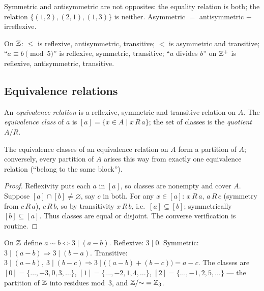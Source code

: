 \begin{notebox}
Symmetric and antisymmetric are not opposites: the equality relation is both;
the relation $\{(1,2),(2,1),(1,3)\}$ is neither. Asymmetric $=$ antisymmetric
$+$ irreflexive.
\end{notebox}

\begin{example}
On $\mathbb{Z}$: $\leq$ is reflexive, antisymmetric, transitive; $<$ is asymmetric and
transitive; ``$a \equiv b \pmod 5$'' is reflexive, symmetric, transitive;
``$a$ divides $b$'' on $\mathbb{Z}^+$ is reflexive, antisymmetric, transitive.
\end{example}

\subsection{Equivalence relations}

\begin{definition}
An \emph{equivalence relation} is a reflexive, symmetric and transitive
relation on $A$. The \emph{equivalence class} of $a$ is
$[a] = \{x \in A \mid x\,R\,a\}$; the set of classes is the \emph{quotient}
$A/R$.
\end{definition}

\begin{theorem}\label{thm:partition}
The equivalence classes of an equivalence relation on $A$ form a partition of
$A$; conversely, every partition of $A$ arises this way from exactly one
equivalence relation (``belong to the same block'').
\end{theorem}

\begin{proof}
Reflexivity puts each $a$ in $[a]$, so classes are nonempty and cover $A$.
Suppose $[a] \cap [b] \neq \varnothing$, say $c$ in both. For any
$x \in [a]$: $x\,R\,a$, $a\,R\,c$ (symmetry from $c\,R\,a$), $c\,R\,b$, so
by transitivity $x\,R\,b$, i.e.\ $[a] \subseteq [b]$; symmetrically
$[b] \subseteq [a]$. Thus classes are equal or disjoint. The converse
verification is routine.
\end{proof}

\begin{example}\label{ex:mod3}
On $\mathbb{Z}$ define $a \sim b \iff 3 \mid (a - b)$. Reflexive: $3 \mid 0$.
Symmetric: $3 \mid (a-b) \Rightarrow 3 \mid (b-a)$. Transitive:
$3 \mid (a-b),\ 3 \mid (b-c) \Rightarrow 3 \mid \bigl((a-b)+(b-c)\bigr) =
a - c$. The classes are
$[0] = \{\dots,-3,0,3,\dots\}$, $[1] = \{\dots,-2,1,4,\dots\}$,
$[2] = \{\dots,-1,2,5,\dots\}$ --- the partition of $\mathbb{Z}$ into residues
mod~$3$, and $\mathbb{Z}/{\sim} = \mathbb{Z}_3$.
\end{example}

